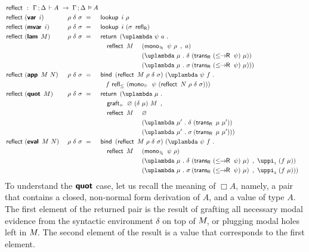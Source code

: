 \documentclass[submission,copyright,creativecommons,sharealike,backref=page]{eptcs}
\newcommand{\sigmas}{\rlap{$\sigma$}\hphantom{\delta}}
\newcommand{\sA}{\mkern-2muA}
\newcommand{\R}{\mathrel{\rlap{$\mkern.75mu\textsf{R}$}\hphantom{\subseteq}}}
\newcommand{\Rs}{\mathrel{\textsf{R}}}
\renewcommand{\:}{\mathop{\mkern3mu:\mkern3mu}}
\renewcommand{\.}{\mathop{\mkern3mu.\mkern3mu}}
\renewcommand{\;}{\mathop{;}}
\renewcommand{\,}{\mathop{,}}
\newcommand{\unit}{\varnothing}
\newcommand{\e}{\mathrel{\mkern2mu\vdash\mkern1mu}}
\newcommand{\ee}{\mathrel{\mkern2mu\Vdash\mkern1mu}}
\newcommand{\ees}{\mathrel{\mkern2mu\Vdash_{\mkern-9mu\scriptscriptstyle{\star}}}}
\newcommand{\ef}{\mathrel{\mkern2mu\vDash\mkern1mu}}
\renewcommand{\r}{\mathrel{\rightarrow\mkern-1mu}}
\newcommand{\reflect}{\operatorname{\textsf{reflect}}}
\newcommand{\monoee}{\operatorname{\textsf{mono}_{\ee}}}
\newcommand{\monoees}{\operatorname{\textsf{mono}_{\ees}}}
\newcommand{\pii}{\operatorname{\uppi_{\scriptscriptstyle{1}}}}
\newcommand{\piii}{\operatorname{\uppi_{\scriptscriptstyle{2}}}}
\newcommand{\reflle}{\operatorname{\textsf{refl}_{\le}}}
\newcommand{\reflR}{\operatorname{\textsf{refl}_{\Rs}}}
\newcommand{\transR}{\operatorname{\textsf{trans}_{\Rs}}}
\newcommand{\lerR}{\operatorname{\le\mkern-1mu\r\mkern-1mu\R}}
\newcommand{\var}{\operatorname{\textsf{\textbf{var}}}}
\newcommand{\mvar}{\operatorname{\textsf{\textbf{mvar}}}}
\newcommand{\lam}{\operatorname{\textsf{\textbf{lam}}}}
\newcommand{\app}{\operatorname{\textsf{\textbf{app}}}}
\newcommand{\quot}{\operatorname{\textsf{\textbf{quot}}}}
\newcommand{\eval}{\operatorname{\textsf{\textbf{eval}}}}
\newcommand{\return}{\operatorname{\textsf{return}}}
\newcommand{\bind}{\operatorname{\textsf{bind}}}
\newcommand{\lookup}{\operatorname{\textsf{lookup}}}
\newcommand{\grafte}{\operatorname{\textsf{graft}_{\e}}}
\theoremstyle{mystyle}
\begin{document}
\begin{alignat*}{5}
  & \reflect ~\:~ \rlap{$\Gamma \; \Delta \e \sA ~\r~ \Gamma \; \Delta \ef \sA$}\\
  & \reflect~(\var~i)    && ~\rho~\delta~\sigma ~=~ && \lookup~\rlap{$i~\rho$}\\
  & \reflect~(\mvar~i)   && ~\rho~\delta~\sigma ~=~ && \lookup~\rlap{$i~(\sigma~\reflR)$}\\
  & \reflect~(\lam~M)    && ~\rho~\delta~\sigma ~=~ && \return~\rlap{$(\uplambda~\psi~a \.$}\\
  &                      &&                         && \quad \reflect~M~ &&(\monoees~\psi~\rho~\,~a)\\
  &                      &&                         &&                   &&(\uplambda~\mu \. \delta~(\transR~(\lerR~\psi)~\mu))\\
  &                      &&                         &&                   &&(\uplambda~\mu \. \sigmas~(\transR~(\lerR~\psi)~\mu)))\\
  & \reflect~(\app~M~N)  && ~\rho~\delta~\sigma ~=~ && \bind~\rlap{$(\reflect~M~\rho~\delta~\sigma)~(\uplambda~\psi~f \.$}\\
  &                      &&                          && \quad f~\rlap{$\reflle~(\monoee~\psi~(\reflect~N~\rho~\delta~\sigma)))$}\\
  & \reflect~(\quot~M)   && ~\rho~\delta~\sigma ~=~ && \return~\rlap{$(\uplambda~\mu \.$}\\
  &                      &&                         && \quad \grafte~\rlap{$\unit~(\delta~\mu)~M~\,$}\\
  &                      &&                         && \quad \reflect~M~ &&\unit\\                                
  &                      &&                         &&                   &&(\uplambda~\mu' \. \delta~(\transR~\mu~\mu'))\\
  &                      &&                         &&                   &&(\uplambda~\mu' \. \sigmas~(\transR~\mu~\mu')))\\
  & \reflect~(\eval~M~N) && ~\rho~\delta~\sigma ~=~ && \bind~\rlap{$(\reflect~M~\rho~\delta~\sigma)~(\uplambda~\psi~f \.$}\\
  &                      &&                         && \quad \reflect~M~ &&(\monoees~\psi~\rho)\\
  &                      &&                         &&                   &&(\uplambda~\mu \. \delta~(\transR~(\lerR~\psi)~\mu)~\,~\pii~(f~\mu))\\
  &                      &&                         &&                   &&(\uplambda~\mu \. \sigmas~(\transR~(\lerR~\psi)~\mu)~\,~\piii~(f~\mu)))
\end{alignat*}
To understand the $\quot$ case, let us recall the meaning of $\Box A$, namely, a pair that contains a closed, non-normal form derivation of $A$, and a value of type $A$.  The first element of the returned pair is the result of grafting all necessary modal evidence from the syntactic environment $\delta$ on top of $M\mkern-3mu$, or plugging modal holes left in $M\mkern-3mu$.  The second element of the result is a value that corresponds to the first element. 
\end{document}
